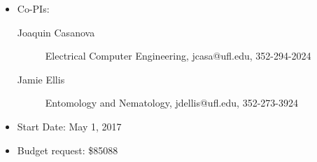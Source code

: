 
\begin{itemize}
\item Co-PIs:
\begin{description}
\item[Joaquin Casanova] Electrical Computer Engineering, jcasa@ufl.edu, 352-294-2024
\item[Jamie Ellis] Entomology and Nematology, jdellis@ufl.edu, 352-273-3924
\end{description}
\item Start Date: May 1, 2017
\item Budget request: \$85088
\end{itemize}
